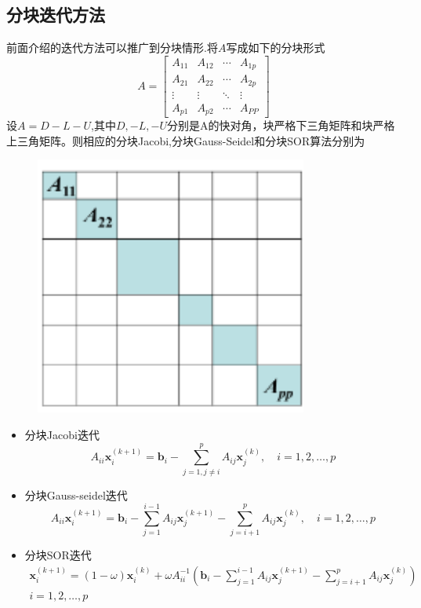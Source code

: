 \documentclass[12pt,a4paper]{article}
\begin{document}
\subsection{\color{blue}分块迭代方法}
前面介绍的迭代方法可以推广到分块情形.将$A$写成如下的分块形式
$$
A=\left[\begin{array}{cccc}{A_{11}} & {A_{12}} & {\cdots} & {A_{1 p}} \\ {A_{21}} & {A_{22}} & {\cdots} & {A_{2 p}} \\ {\vdots} & {\vdots} & {\ddots} & {\vdots} \\ {A_{p 1}} & {A_{p 2}} & {\cdots} & {A_{P P}}\end{array}\right]
$$
设$A=D-L-U$,其中$D,-L,-U$分别是A的快对角，块严格下三角矩阵和块严格上三角矩阵。则相应的分块Jacobi,分块Gauss-Seidel和分块SOR算法分别为
\begin{figure}[h]
\includegraphics[width=0.8\textwidth]{./figures/figure2.png} 
\end{figure}
\begin{itemize}
\item {\color{blue}分块Jacobi迭代}$$
A_{i i} \boldsymbol{x}_{i}^{(k+1)}=\boldsymbol{b}_{i}-\sum_{j=1, j \neq i}^{p} A_{i j} \boldsymbol{x}_{j}^{(k)}, \quad i=1,2, \ldots, p
$$
\item {\color{blue}分块Gauss-seidel迭代}$$
A_{i i} \boldsymbol{x}_{i}^{(k+1)}=\boldsymbol{b}_{i}-\sum_{j=1}^{i-1} A_{i j} \boldsymbol{x}_{j}^{(k+1)}-\sum_{j=i+1}^{p} A_{i j} \boldsymbol{x}_{j}^{(k)}, \quad i=1,2, \ldots, p
$$
\item {\color{blue}分块SOR迭代}$$
\begin{array}{c}{\boldsymbol{x}_{i}^{(k+1)}=(1-\omega) \boldsymbol{x}_{i}^{(k)}+\omega A_{i i}^{-1}\left(\boldsymbol{b}_{i}-\sum_{j=1}^{i-1} A_{i j} \boldsymbol{x}_{j}^{(k+1)}-\sum_{j=i+1}^{p} A_{i j} \boldsymbol{x}_{j}^{(k)}\right)} \\ {i=1,2, \ldots, p}\end{array}
$$
\end{itemize}
\end{document}
